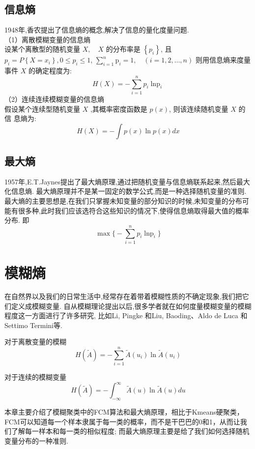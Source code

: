 \subsection{信息熵}
1948年,香农\cite{1948A}提出了信息熵的概念,解决了信息的量化度量问题.\\
（1）离散模糊变量的信息熵\\
设某个离散型的随机变量 $X, \quad X$ 的分布率是 $\left\{p_{i}\right\}$, 且 $p_{i}=P\left\{X=x_{i}\right\}, 0 \leq p_{i} \leq 1$,
$\sum_{i=1}^n \mathrm{p}_i=1, \quad(i=1,2 ,\dots, n)$ 则用信息熵来度量事件 $X$ 的确定程度为:
\begin{equation}
    H(X) =-\sum_{i=1}^{n} p_{i} \operatorname{\ln p}_{i}
\end{equation}
（2）连续连续模糊变量的信息熵\\
假设某个连续型随机变量 $X$ ,其概率密度函数是 $p(x)$, 则该连续随机变量 $X$ 的信
息熵为:
\begin{equation}
    H(X)=-\int p(x) \ln p(x) d x
\end{equation}

\subsection{最大熵}
1957年,E.T.Jaynes提出了最大熵原理,通过把随机变量与信息熵联系起来,然后最大化信息熵.
最大熵原理并不是某一固定的数学公式,而是一种选择随机变量的准则.
最大熵的主要思想是,在我们只掌握未知变量的部分知识的时候,未知变量的分布可能有很多种,此时我们应该选符合这些知识的情况下,使得信息熵取得最大值的概率分布.
即\newpage
\[
    \max \biggl\{-\sum_{i=1}^{n} p_{i} \operatorname{\ln p}_{i}\biggr\}
\]
\section{模糊熵}
在自然界以及我们的日常生活中,经常存在着带着模糊性质的不确定现象,我们把它们定义成模糊变量.
自从模糊理论提出以后,很多学者就在如何度量模糊变量的模糊程度这一方面进行了许多研究,
比如Li, Pingke 和Liu, Baoding\cite{li2008entropy}、Aldo de Luca 和 Settimo Termini\cite{RN3}等.
\begin{definition}[模糊熵]
    对于离散变量的模糊
    \begin{equation}
        H(\tilde{A})=-\sum_{i=1}^{n}\tilde{A}(u_i) \ln \tilde{A}(u_i)
    \end{equation}

    对于连续的模糊变量
    \begin{equation}
        H(\tilde{A})=-\int_{-\infty}^{\infty}\tilde{A}(u) \ln \tilde{A}(u) d u
    \end{equation}

\end{definition}
本章主要介绍了模糊聚类中的FCM算法和最大熵原理，相比于Kmeans硬聚类，FCM可以知道每一个样本隶属于每一类的概率，而不是干巴巴的0和1，从而让我们了解每一样本和每一类的相似程度;
而最大熵原理主要是给了我们如何选择随机变量分布的一种准则.